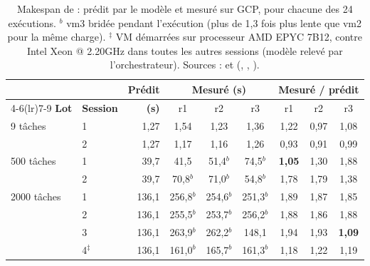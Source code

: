 \begin{table}[H]
\centering\small
\begin{tabular}{llr@{\hspace{1.2em}}ccc@{\hspace{1.2em}}ccc}
\toprule
 & & \textbf{Prédit} & \multicolumn{3}{c}{\textbf{Mesuré (s)}} & \multicolumn{3}{c}{\textbf{Mesuré / prédit}} \\
\cmidrule(lr){4-6}\cmidrule(lr){7-9}
\textbf{Lot} & \textbf{Session} & \textbf{(s)} & r1 & r2 & r3 & r1 & r2 & r3 \\
\midrule
9 tâches    & 1 & 1,27  & 1,54  & 1,23  & 1,36  & 1,22 & 0,97 & 1,08 \\
            & 2 & 1,27  & 1,17  & 1,16  & 1,26  & 0,93 & 0,91 & 0,99 \\
\midrule
500 tâches  & 1 & 39,7  & 41,5  & 51,4$^{b}$  & 74,5$^{b}$  & \textbf{1,05} & 1,30 & 1,88 \\
            & 2 & 39,7  & 70,8$^{b}$  & 71,0$^{b}$  & 54,8$^{b}$  & 1,78 & 1,79 & 1,38 \\
\midrule
2000 tâches & 1 & 136,1 & 256,8$^{b}$ & 254,6$^{b}$ & 251,3$^{b}$ & 1,89 & 1,87 & 1,85 \\
            & 2 & 136,1 & 255,5$^{b}$ & 253,7$^{b}$ & 256,2$^{b}$ & 1,88 & 1,86 & 1,88 \\
            & 3 & 136,1 & 263,9$^{b}$ & 262,2$^{b}$ & 148,1 & 1,94 & 1,93 & \textbf{1,09} \\
            & 4$^{\ddagger}$ & 136,1 & 161,0$^{b}$ & 165,7$^{b}$ & 161,3$^{b}$ & 1,18 & 1,22 & 1,19 \\
\bottomrule
\end{tabular}
\caption{Makespan de \sel{} : prédit par le modèle et mesuré sur GCP, pour
chacune des 24 exécutions. $^{b}$ vm3 bridée pendant l'exécution (plus de 1,3 fois
plus lente que vm2 pour la même charge). $^{\ddagger}$ VM démarrées sur processeur AMD EPYC 7B12, contre Intel Xeon @ 2.20GHz dans toutes les autres sessions (modèle relevé par l'orchestrateur).
Sources :  et 
(, , ).}
\label{tab:precision_select}
\end{table}

